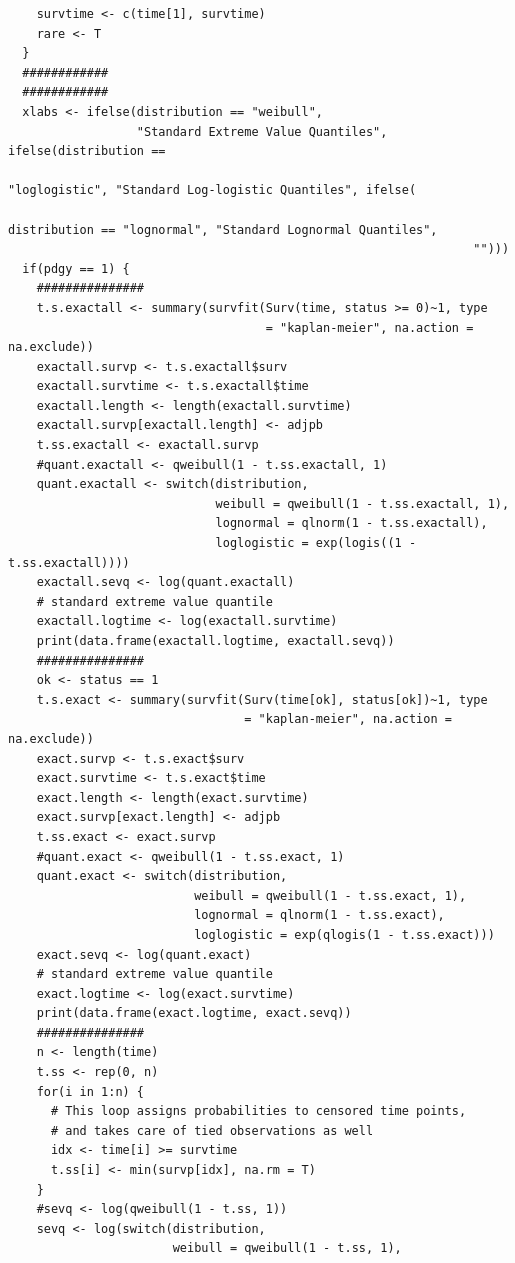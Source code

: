 \documentclass[
]{article}
\begin{document}
\begin{verbatim}
    survtime <- c(time[1], survtime)
    rare <- T
  }
  ############
  ############
  xlabs <- ifelse(distribution == "weibull", 
                  "Standard Extreme Value Quantiles", ifelse(distribution == 
                                                               "loglogistic", "Standard Log-logistic Quantiles", ifelse(
                                                                 distribution == "lognormal", "Standard Lognormal Quantiles",
                                                                 "")))
  if(pdgy == 1) {
    ###############
    t.s.exactall <- summary(survfit(Surv(time, status >= 0)~1, type
                                    = "kaplan-meier", na.action = na.exclude))
    exactall.survp <- t.s.exactall$surv
    exactall.survtime <- t.s.exactall$time
    exactall.length <- length(exactall.survtime)
    exactall.survp[exactall.length] <- adjpb
    t.ss.exactall <- exactall.survp
    #quant.exactall <- qweibull(1 - t.ss.exactall, 1)
    quant.exactall <- switch(distribution,
                             weibull = qweibull(1 - t.ss.exactall, 1),
                             lognormal = qlnorm(1 - t.ss.exactall),
                             loglogistic = exp(logis((1 - t.ss.exactall))))
    exactall.sevq <- log(quant.exactall)
    # standard extreme value quantile
    exactall.logtime <- log(exactall.survtime)
    print(data.frame(exactall.logtime, exactall.sevq))
    ############### 
    ok <- status == 1
    t.s.exact <- summary(survfit(Surv(time[ok], status[ok])~1, type
                                 = "kaplan-meier", na.action = na.exclude))
    exact.survp <- t.s.exact$surv
    exact.survtime <- t.s.exact$time
    exact.length <- length(exact.survtime)
    exact.survp[exact.length] <- adjpb
    t.ss.exact <- exact.survp
    #quant.exact <- qweibull(1 - t.ss.exact, 1)
    quant.exact <- switch(distribution,
                          weibull = qweibull(1 - t.ss.exact, 1),
                          lognormal = qlnorm(1 - t.ss.exact),
                          loglogistic = exp(qlogis(1 - t.ss.exact)))
    exact.sevq <- log(quant.exact)
    # standard extreme value quantile
    exact.logtime <- log(exact.survtime)
    print(data.frame(exact.logtime, exact.sevq))
    ###############
    n <- length(time)
    t.ss <- rep(0, n)
    for(i in 1:n) {
      # This loop assigns probabilities to censored time points, 
      # and takes care of tied observations as well
      idx <- time[i] >= survtime
      t.ss[i] <- min(survp[idx], na.rm = T)
    }
    #sevq <- log(qweibull(1 - t.ss, 1))
    sevq <- log(switch(distribution,
                       weibull = qweibull(1 - t.ss, 1),

\end{verbatim}
\end{document}
